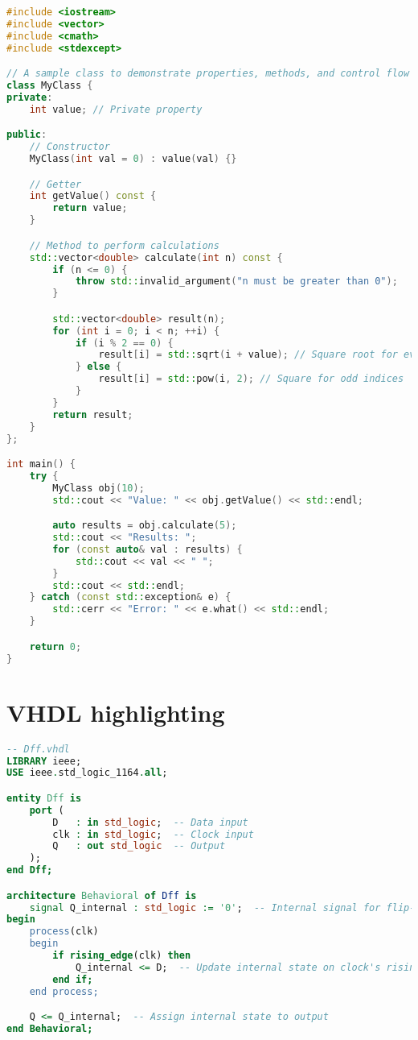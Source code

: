 \documentclass[12pt]{article}
\begin{document}
\begin{lstlisting}[caption={This is a literal C++}, label={lst:cpp1}, language=c++, style=customcpp]
#include <iostream>
#include <vector>
#include <cmath>
#include <stdexcept>

// A sample class to demonstrate properties, methods, and control flow
class MyClass {
private:
    int value; // Private property

public:
    // Constructor
    MyClass(int val = 0) : value(val) {}

    // Getter
    int getValue() const {
        return value;
    }

    // Method to perform calculations
    std::vector<double> calculate(int n) const {
        if (n <= 0) {
            throw std::invalid_argument("n must be greater than 0");
        }

        std::vector<double> result(n);
        for (int i = 0; i < n; ++i) {
            if (i % 2 == 0) {
                result[i] = std::sqrt(i + value); // Square root for even indices
            } else {
                result[i] = std::pow(i, 2); // Square for odd indices
            }
        }
        return result;
    }
};

int main() {
    try {
        MyClass obj(10);
        std::cout << "Value: " << obj.getValue() << std::endl;

        auto results = obj.calculate(5);
        std::cout << "Results: ";
        for (const auto& val : results) {
            std::cout << val << " ";
        }
        std::cout << std::endl;
    } catch (const std::exception& e) {
        std::cerr << "Error: " << e.what() << std::endl;
    }

    return 0;
}
\end{lstlisting}


\section{VHDL highlighting}

\begin{lstlisting}[caption={This is a literal VHDL}, label={lst:vhdl1}, language=VHDL, style=customvhdl]
-- Dff.vhdl
LIBRARY ieee;
USE ieee.std_logic_1164.all;

entity Dff is
    port (
        D   : in std_logic;  -- Data input
        clk : in std_logic;  -- Clock input
        Q   : out std_logic  -- Output
    );
end Dff;

architecture Behavioral of Dff is
    signal Q_internal : std_logic := '0';  -- Internal signal for flip-flop state
begin
    process(clk)
    begin
        if rising_edge(clk) then
            Q_internal <= D;  -- Update internal state on clock's rising edge
        end if;
    end process;

    Q <= Q_internal;  -- Assign internal state to output
end Behavioral;
\end{lstlisting}

\end{document}
